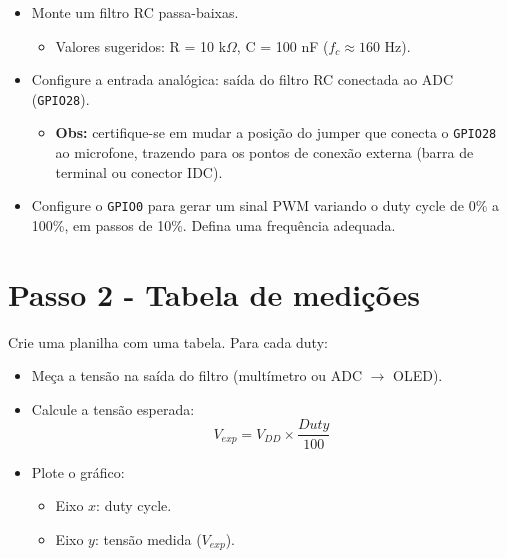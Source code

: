 \documentclass{article}
\begin{document}
\begin{itemize}
    \item Monte um filtro RC passa-baixas. 
    \begin{itemize}
        \item Valores sugeridos: R = 10 k$\Omega$, C = 100 nF ($f_c \approx 160$ Hz).
    \end{itemize}
    \item Configure a entrada analógica: saída do filtro RC conectada ao ADC (\texttt{GPIO28}). 
    \begin{itemize}
        \item \textbf{Obs:} certifique-se em mudar a posição do jumper que conecta o \texttt{GPIO28} ao microfone, trazendo para os pontos de conexão externa (barra de terminal ou conector IDC).
    \end{itemize}
    \item Configure o \texttt{GPIO0} para gerar um sinal PWM variando o duty cycle de 0\% a 100\%, em passos de 10\%. Defina uma frequência adequada.
\end{itemize}

\section{Passo 2 - Tabela de medições}

\noindent
Crie uma planilha com uma tabela. Para cada duty:

\begin{itemize}
    \item Meça a tensão na saída do filtro (multímetro ou ADC $\rightarrow$ OLED).
    \item Calcule a tensão esperada: 
    \begin{equation}
        V_{exp} = V_{DD} \times \frac{Duty}{100}
    \end{equation}

    \item Plote o gráfico:
    \begin{itemize}
        \item Eixo $x$: duty cycle.
        \item Eixo $y$: tensão medida ($V_{exp}$).
    \end{itemize}
\end{itemize}
\end{document}
